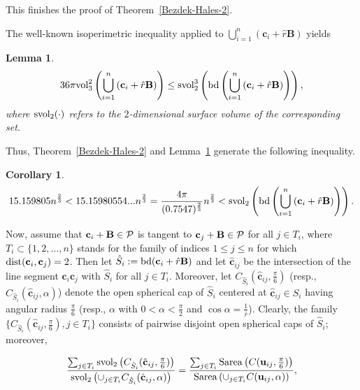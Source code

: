 \documentclass[10pt]{article}
\newtheorem{Lemma}{Lemma}
\newtheorem{Corollary}{Corollary}
\numberwithin{Subcase}{Case}
\begin{document}
This finishes the proof of Theorem~\ref{Bezdek-Hales-2}. 
\endproof



 

The well-known isoperimetric inequality \cite{Os78} applied to $\bigcup_{i=1}^n\left(\mathbf{c}_i+\hat{r}\mathbf{B}\right)$ yields 

\begin{Lemma}\label{isoperimetric-inequality}
$$36\pi{\rm vol}_3^2\left(\bigcup_{i=1}^n\left(\mathbf{c}_i+\hat{r}\mathbf{B}\right)\right)
\le{\rm svol}_2^3\left({\rm bd}\left(\bigcup_{i=1}^n\left(\mathbf{c}_i+\hat{r}\mathbf{B}\right)\right)\right),$$
where ${\rm svol}_2(\cdot)$ refers to the $2$-dimensional surface volume of the corresponding set.
\end{Lemma}

Thus, Theorem~\ref{Bezdek-Hales-2} and Lemma~\ref{isoperimetric-inequality} generate the following inequality.

\begin{Corollary}\label{lower-bound-for-surface-area-in-3D}
$$15.159805n^{\frac{2}{3}}<15.15980554...n^{\frac{2}{3}}=\frac{4\pi}{(0.7547)^{\frac{2}{3}}}n^{\frac{2}{3}}< {\rm svol}_2\left({\rm bd}\left(\bigcup_{i=1}^n\left(\mathbf{c}_i+\hat{r}\mathbf{B}\right)\right)\right).$$
\end{Corollary}

Now, assume that $\mathbf{c}_i+\mathbf{B}\in {\cal P}$ is tangent to $\mathbf{c}_j+\mathbf{B}\in {\cal P}$ for all $j\in T_i$, where $T_i\subset\{1, 2, \dots , n\}$ stands for the family of indices $1\le j\le n$ for which ${\rm dist}(\mathbf{c}_i, \mathbf{c}_j)=2$. Then let
$\hat{S}_i:={\rm bd}(\mathbf{c}_i+\hat{r}\mathbf{B})$ and let $\hat{\mathbf{c}}_{ij}$ be the intersection of the line segment $\mathbf{c}_i\mathbf{c}_j$ with $\hat{S}_i$ for all $j\in T_i$. Moreover, let $C_{\hat{S}_i}(\hat{\mathbf{c}}_{ij}, \frac{\pi}{6})$ (resp., $C_{\hat{S}_i}(\hat{\mathbf{c}}_{ij}, \alpha)$) denote the open spherical cap of $\hat{S}_i$ centered at $\hat{\mathbf{c}}_{ij}\in \hat{S}_i$ having angular radius $\frac{\pi}{6}$ (resp., $\alpha$ with $0<\alpha<\frac{\pi}{2}$ and $\cos\alpha=\frac{1}{\hat{r}}$). Clearly, the family $\{C_{\hat{S}_i}(\hat{\mathbf{c}}_{ij}, \frac{\pi}{6}), j\in T_i\}$ consists of pairwise disjoint open spherical caps of $\hat{S}_i$; moreover,


\begin{equation}\label{Bezdek-estimate-I}
\frac{\sum_{j\in T_i}{\rm svol}_2\left(C_{\hat{S}_i}(\hat{\mathbf{c}}_{ij}, \frac{\pi}{6})\right)}{{\rm svol}_2\left(\cup_{j\in T_i}C_{\hat{S}_i}(\hat{\mathbf{c}}_{ij}, \alpha)\right)}=
\frac{\sum_{j\in T_i}{\rm Sarea}\left(C(\mathbf{u}_{ij}, \frac{\pi}{6})\right)}{{\rm Sarea}\left(\cup_{j\in T_i}C(\mathbf{u}_{ij}, \alpha)\right)},
\end{equation}
\end{document}
